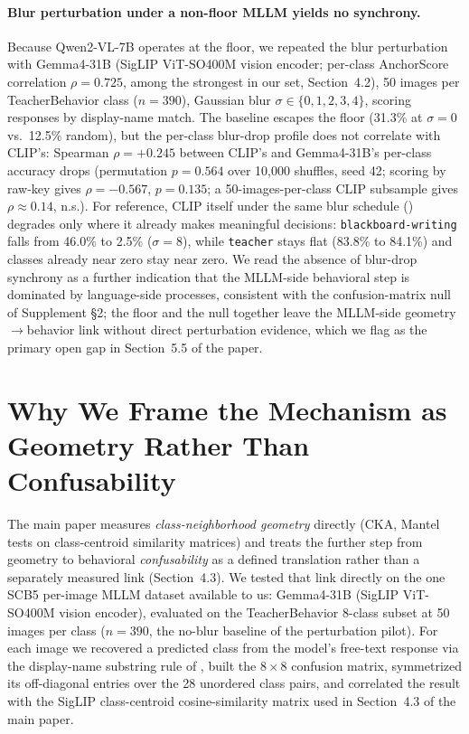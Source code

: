 \documentclass[11pt,a4paper]{article}
\begin{document}
\paragraph{Blur perturbation under a non-floor MLLM yields no synchrony.}
Because Qwen2-VL-7B operates at the floor, we repeated the blur perturbation with Gemma4-31B (SigLIP ViT-SO400M vision encoder; per-class AnchorScore correlation $\rho=0.725$, among the strongest in our set, Section~4.2), 50 images per TeacherBehavior class ($n=390$), Gaussian blur $\sigma \in \{0,1,2,3,4\}$, scoring responses by display-name match. The baseline escapes the floor (31.3\% at $\sigma=0$ vs.\ 12.5\% random), but the per-class blur-drop profile does not correlate with CLIP's: Spearman $\rho = +0.245$ between CLIP's and Gemma4-31B's per-class accuracy drops (permutation $p=0.564$ over 10{,}000 shuffles, seed 42; scoring by raw-key gives $\rho=-0.567$, $p=0.135$; a 50-images-per-class CLIP subsample gives $\rho \approx 0.14$, n.s.). For reference, CLIP itself under the same blur schedule () degrades only where it already makes meaningful decisions: \texttt{blackboard-writing} falls from 46.0\% to 2.5\% ($\sigma=8$), while \texttt{teacher} stays flat (83.8\% to 84.1\%) and classes already near zero stay near zero. We read the absence of blur-drop synchrony as a further indication that the MLLM-side behavioral step is dominated by language-side processes, consistent with the confusion-matrix null of Supplement \S2; the floor and the null together leave the MLLM-side geometry$\to$behavior link without direct perturbation evidence, which we flag as the primary open gap in Section~5.5 of the paper.

\section*{Why We Frame the Mechanism as Geometry Rather Than Confusability}
\label{sec:confusion_null}

The main paper measures \emph{class-neighborhood geometry} directly (CKA, Mantel tests on class-centroid similarity matrices) and treats the further step from geometry to behavioral \emph{confusability} as a defined translation rather than a separately measured link (Section~4.3). We tested that link directly on the one SCB5 per-image MLLM dataset available to us: Gemma4-31B (SigLIP ViT-SO400M vision encoder), evaluated on the TeacherBehavior 8-class subset at 50 images per class ($n=390$, the no-blur baseline of the perturbation pilot). For each image we recovered a predicted class from the model's free-text response via the display-name substring rule of , built the $8\times8$ confusion matrix, symmetrized its off-diagonal entries over the 28 unordered class pairs, and correlated the result with the SigLIP class-centroid cosine-similarity matrix used in Section~4.3 of the main paper.
\end{document}
